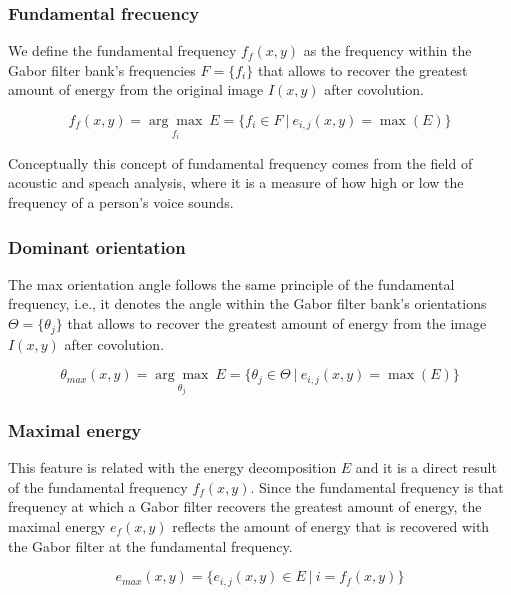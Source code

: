 \subsubsection{Fundamental frecuency}
We define the fundamental frequency $f_{f}(x,y)$ as the frequency within the Gabor filter bank's frequencies $F=\lbrace f_i \rbrace$ that allows to recover the greatest amount of energy from the original image $I(x,y)$ after covolution. 

\begin{equation}
	f_{f}(x,y) =  \underset{f_{i}}{\arg\max} ~ E = \lbrace f_{i} \in F ~|~ e_{i,j}(x,y) = \max(E)\rbrace  \label{eq:fundamental_freq}
\end{equation}

Conceptually this concept of fundamental frequency comes from the field of acoustic and speach analysis, where it is a measure of how high or low the frequency of a person's voice sounds.

\subsubsection{Dominant orientation}
The max orientation angle follows the same principle of the fundamental frequency, i.e., it denotes the angle within the Gabor filter bank's orientations $\Theta=\lbrace \theta_j \rbrace$ that allows to recover the greatest amount of energy from the image $I(x, y)$ after covolution.

\begin{equation}
	\theta_{max}(x,y) = \underset{\theta_{j}}{\arg\max} ~ E = \lbrace \theta_{j} \in \Theta ~|~ e_{i,j}(x, y) = \max(E)\rbrace 
\end{equation}

\subsubsection{Maximal energy}
This feature is related with the energy decomposition $E$ and it is a direct result of the fundamental frequency $f_f(x,y)$. Since the fundamental frequency is that frequency at which a Gabor filter recovers the greatest amount of energy, the maximal energy $e_{f}(x,y)$ reflects the amount of energy that is recovered with the Gabor filter at the fundamental frequency.

\begin{equation}
	e_{max}(x,y) = \lbrace e_{i,j}(x,y) \in E ~|~ i = f_{f}(x,y) \rbrace \label{eq:max_energy}
\end{equation}

